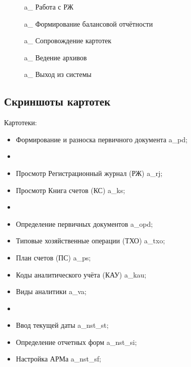 \begin{figure}[h!]
    \centering
    \caption{\gpiFIO\/a\_ Работа с РЖ}
\end{figure}

\begin{figure}[h!]
    \centering
    \caption{\gpiFIO\/a\_ Формирование балансовой отчётности}
\end{figure}

\begin{figure}[h!]
    \centering
    \caption{\gpiFIO\/a\_ Сопровождение картотек}
\end{figure}

\begin{figure}[h!]
    \centering
    \caption{\gpiFIO\/a\_ Ведение архивов}
\end{figure}

\begin{figure}[h!]
    \centering
    \caption{\gpiFIO\/a\_ Выход из системы}
\end{figure}

\newpage

\subsection{Скриншоты картотек}

Картотеки:

\begin{itemize}
\item Формирование и разноска первичного документа \gpiFIO\/a\_pd;
\item[] \hspace{0pt}
\item Просмотр Регистрационный журнал (РЖ) \gpiFIO\/a\_rj;
\item Просмотр Книга счетов (КС) \gpiFIO\/a\_ks;
\item[] \hspace{0pt}
\item Определение первичных документов \gpiFIO\/a\_opd;
\item Типовые хозяйственные операции (ТХО) \gpiFIO\/a\_txo;
\item План счетов (ПС) \gpiFIO\/a\_ps;
\item Коды аналитического учёта (КАУ) \gpiFIO\/a\_kau;
\item Виды аналитики \gpiFIO\/a\_va;
\item[] \hspace{0pt}
\item Ввод текущей даты \gpiFIO\/a\_nst\_st;
\item Определение отчетных форм \gpiFIO\/a\_nst\_si;
\item Настройка АРМа \gpiFIO\/a\_nst\_sf;
\end{itemize}

